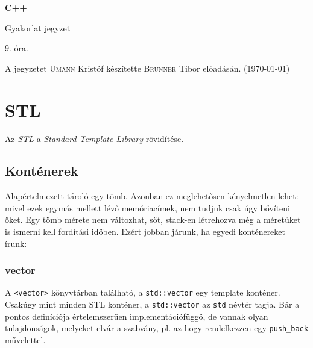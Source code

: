 \documentclass[a4paper,11.5pt]{article}
\begin{document}
	\setlength\parindent{0pt}
	\def\s{\hspace{0.2mm}\vphantom{\beta}}
	\def\Z{\mathbb{Z}}
	\def\Q{\mathbb{Q}}
	\def\R{\mathbb{R}}
	\def\C{\mathbb{C}}
	\def\N{\mathbb{N}}
	\def\Ra{\overline{\mathbb{R}}}
	
	\def\sume{\displaystyle\sum_{n=1}^{+\infty}}
	\def\sumn{\displaystyle\sum_{n=0}^{+\infty}}
	
	\def\narrow{\underset{n\rightarrow+\infty}{\longrightarrow}}
	\def\limn{\displaystyle\lim_{n\to +\infty}}
	\def\limx{\displaystyle\lim_{x\to +\infty}}
	
	\theoremstyle{definition}
	\newtheorem{theorem}{Tétel}[subsection] 
	
	\theoremstyle{definition}
	\newtheorem{definition}[theorem]{Definíció} 
	\newtheorem{example}[theorem]{Példa} 
	\newtheorem{task}[theorem]{Feladat} 
	\newtheorem{note}[theorem]{Megjegyzés}
	\begin{center}
		{\LARGE\textbf{C++}}
		
		{\Large Gyakorlat jegyzet}
		
		9. óra.
	\end{center}
	A jegyzetet \textsc{Umann} Kristóf készítette \textsc{Brunner} Tibor  előadásán. (\today)
	
	\section{STL}

	Az \textit{STL} a \textit{Standard Template Library} rövidítése.

	\subsection{Konténerek}
	Alapértelmezett tároló egy tömb. Azonban ez meglehetősen kényelmetlen lehet: mivel ezek egymás mellett lévő memóriacímek, nem tudjuk csak úgy bővíteni őket. Egy tömb mérete nem változhat, sőt, stack-en létrehozva még a méretüket is ismerni kell fordítási időben. Ezért jobban járunk, ha egyedi konténereket írunk:
	\subsubsection{vector}
	A \texttt{<vector>} könyvtárban található, a \texttt{std::vector} egy template konténer. Csakúgy mint minden STL konténer, a \texttt{std::vector} az \texttt{std} névtér tagja. Bár a pontos definíciója értelemszerűen implementációfüggő, de vannak olyan tulajdonságok, melyeket elvár a szabvány, pl. az hogy rendelkezzen egy \texttt{push\_back} művelettel.
	\smallskip
	
\end{document}
